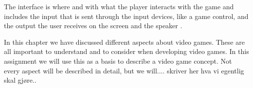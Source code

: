 The interface is where and with what the player interacts with the game and includes the input that is sent through the input devices, like a game control, and the output the user receives on the screen and the speaker \cite{umlapproach}.

In this chapter we have discussed different aspects about video games. These are all important to understand and to consider when developing video games. In this assignment we will use this as a basis to describe a video game concept. Not every aspect will be described in detail, but we will.... skriver her hva vi egentlig skal gjøre.. 

